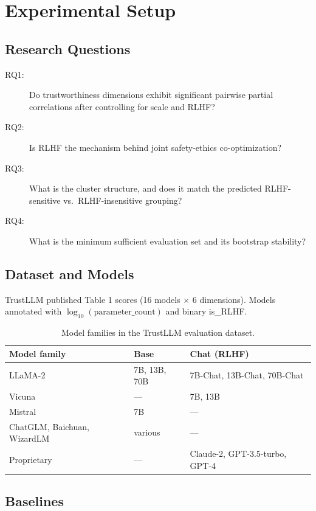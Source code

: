 \section{Experimental Setup}
\label{sec:setup}

\subsection{Research Questions}

\begin{description}
  \item[RQ1:] Do trustworthiness dimensions exhibit significant pairwise partial correlations after controlling for scale and RLHF?
  \item[RQ2:] Is RLHF the mechanism behind joint safety-ethics co-optimization?
  \item[RQ3:] What is the cluster structure, and does it match the predicted RLHF-sensitive vs.\ RLHF-insensitive grouping?
  \item[RQ4:] What is the minimum sufficient evaluation set and its bootstrap stability?
\end{description}

\subsection{Dataset and Models}

TrustLLM published Table 1 scores (16 models $\times$ 6 dimensions). Models annotated with $\log_{10}(\text{parameter\_count})$ and binary is\_RLHF.

\begin{table}[h]
\centering
\caption{Model families in the TrustLLM evaluation dataset.}
\label{tab:models}
\begin{tabular}{lll}
\toprule
\textbf{Model family} & \textbf{Base} & \textbf{Chat (RLHF)} \\
\midrule
LLaMA-2 & 7B, 13B, 70B & 7B-Chat, 13B-Chat, 70B-Chat \\
Vicuna & --- & 7B, 13B \\
Mistral & 7B & --- \\
ChatGLM, Baichuan, WizardLM & various & --- \\
Proprietary & --- & Claude-2, GPT-3.5-turbo, GPT-4 \\
\bottomrule
\end{tabular}
\end{table}

\subsection{Baselines}

